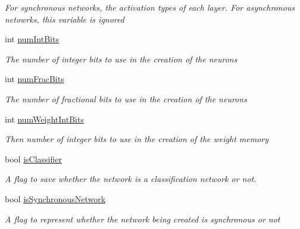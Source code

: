 \begin{DoxyCompactItemize}
\begin{DoxyCompactList}\small\item\em For synchronous networks, the activation types of each layer. For asynchronous netowrks, this variable is ignored \end{DoxyCompactList}\item 
int \hyperlink{class_n_n_gen_1_1_wizard_controller_a5216441fbf991464e4db1b1cc1d54c2d}{num\+Int\+Bits}
\begin{DoxyCompactList}\small\item\em The number of integer bits to use in the creation of the neurons \end{DoxyCompactList}\item 
int \hyperlink{class_n_n_gen_1_1_wizard_controller_a49f443f5a43ad1afbbf72a4176e1dcd6}{num\+Frac\+Bits}
\begin{DoxyCompactList}\small\item\em The number of fractional bits to use in the creation of the neurons \end{DoxyCompactList}\item 
int \hyperlink{class_n_n_gen_1_1_wizard_controller_a8aafaab7cca2632ebd09f0fba6a2f09a}{num\+Weight\+Int\+Bits}
\begin{DoxyCompactList}\small\item\em Then number of integer bits to use in the creation of the weight memory \end{DoxyCompactList}\item 
bool \hyperlink{class_n_n_gen_1_1_wizard_controller_a9314043770a6c63e71dadc2c3abaf63a}{is\+Classifier}
\begin{DoxyCompactList}\small\item\em A flag to save whether the network is a classification network or not. \end{DoxyCompactList}\item 
bool \hyperlink{class_n_n_gen_1_1_wizard_controller_aa3186397159e779da8e2007b9f1c2884}{is\+Synchronous\+Network}
\begin{DoxyCompactList}\small\item\em A flag to represent whether the network being created is synchronous or not \end{DoxyCompactList}\item 

\end{DoxyCompactItemize}
